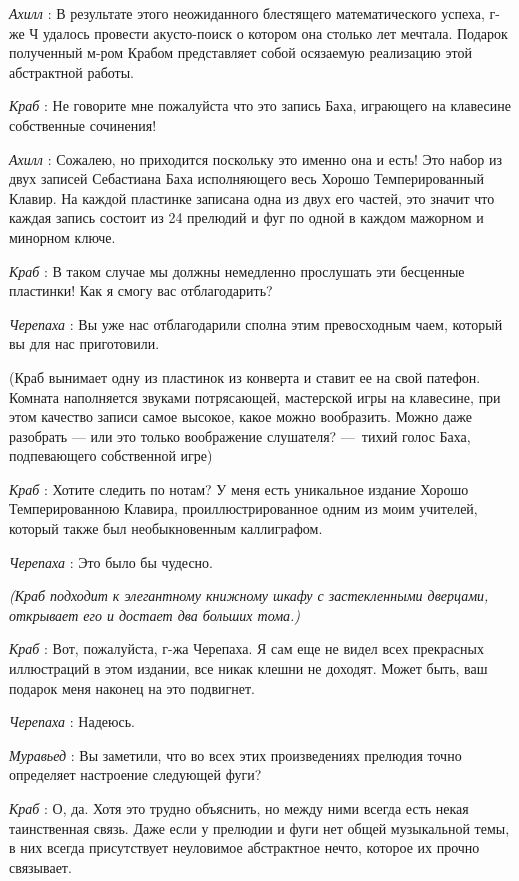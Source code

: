 \emph{Ахилл} : В результате этого неожиданного блестящего математического успеха, г-же Ч удалось провести акусто-поиск о котором она столько лет мечтала. Подарок полученный м-ром Крабом представляет собой осязаемую реализацию этой абстрактной работы.

\emph{Краб} : Не говорите мне пожалуйста что это запись Баха, играющего на клавесине собственные сочинения!

\emph{Ахилл} : Сожалею, но приходится поскольку это именно она и есть! Это набор из двух записей Себастиана Баха исполняющего весь Хорошо Темперированный Клавир. На каждой пластинке записана одна из двух его частей, это значит что каждая запись состоит из 24 прелюдий и фуг по одной в каждом мажорном и минорном ключе.

\emph{Краб} : В таком случае мы должны немедленно прослушать эти бесценные пластинки! Как я смогу вас отблагодарить?

\emph{Черепаха} : Вы уже нас отблагодарили сполна этим превосходным чаем, который вы для нас приготовили.

(Краб вынимает одну из пластинок из конверта и ставит ее на свой патефон. Комната наполняется звуками потрясающей, мастерской игры на клавесине, при этом качество записи самое высокое, какое можно вообразить. Можно даже разобрать --- или это только воображение слушателя? ---~тихий голос Баха, подпевающего собственной игре)

\emph{Краб} : Хотите следить по нотам? У меня есть уникальное издание Хорошо Темперированною Клавира, проиллюстрированное одним из моим учителей, который также был необыкновенным каллиграфом.

\emph{Черепаха} : Это было бы чудесно.

\emph{(Краб подходит к элегантному книжному шкафу с застекленными дверцами, открывает его и достает два больших тома.)}

\emph{Краб} : Вот, пожалуйста, г-жа Черепаха. Я сам еще не видел всех прекрасных иллюстраций в этом издании, все никак клешни не доходят. Может быть, ваш подарок меня наконец на это подвигнет.

\emph{Черепаха} : Надеюсь.

\emph{Муравьед} : Вы заметили, что во всех этих произведениях прелюдия точно определяет настроение следующей фуги?

\emph{Краб} : О, да. Хотя это трудно объяснить, но между ними всегда есть некая таинственная связь. Даже если у прелюдии и фуги нет общей музыкальной темы, в них всегда присутствует неуловимое абстрактное нечто, которое их прочно связывает.

